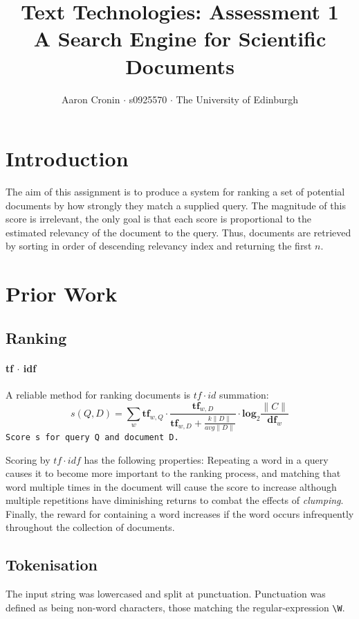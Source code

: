 \documentclass[10pt, a4paper, twocolumn]{article}   	%
\title{Text Technologies: Assessment 1 \\
A Search Engine for Scientific Documents}
\author{Aaron Cronin $\cdot$ s0925570 $\cdot$ The University of Edinburgh}
\date	{}						%
\begin{document}
\maketitle
\section{Introduction}
The aim of this assignment is to produce a system for ranking a set of potential documents by how strongly they match a supplied query. The magnitude of this score is irrelevant, the only goal is that each score is proportional to the estimated relevancy of the document to the query. Thus, documents are retrieved by sorting in order of descending relevancy index and returning the first $n$.
\section{Prior Work}
\subsection{Ranking}
\paragraph{tf $\cdot$ idf}
A reliable method for ranking documents is $tf \cdot id$ summation:
\begin{equation}
s(Q,D) = \sum_{w}\mathbf{tf}_{w, Q} \cdot \frac
{\mathbf{tf}_{w, D}}
{\mathbf{tf}_{w, D} + \frac{k \|D\|}{avg \|D\|}} \cdot \mathbf{log}_{2}\frac{\|C\|}{\mathbf{df}_{w}}
\end{equation}
\verb|Score s for query Q and document D.|

Scoring by $tf \cdot idf$ has the following properties: Repeating a word in a query causes it to become more important to the ranking process, and matching that word multiple times in the document will cause the score to increase \textendash{} although multiple repetitions have diminishing returns to combat the effects of \emph{clumping}. Finally, the reward for containing a word increases if the word occurs infrequently throughout the collection of documents.

\subsection{Tokenisation}
The input string was lowercased and split at punctuation. Punctuation was defined as being non-word characters, those matching the regular-expression \verb|\W|.
\end{document}
